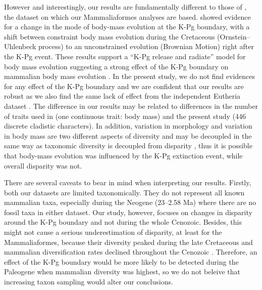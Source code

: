 \documentclass[12pt,letterpaper]{article}
\begin{document}
However and interestingly, our results are fundamentally different to those of \cite{Slater2012MEE}, the dataset on which our Mammaliaformes analyses are based. 
\cite{Slater2012MEE} showed evidence for a change in the mode of body-mass evolution at the K-Pg boundary, with a shift between constraint body mass evolution during the Cretaceous (Ornstein–Uhlenbeck process) to an unconstrained evolution (Brownian Motion) right after the K-Pg event.
These results support a ``K-Pg release and radiate'' model for body mass evolution suggesting a strong effect of the K-Pg boundary on mammalian body mass evolution \citep{Slater2012MEE}. %
In the present study, we do not find evidences for any effect of the K-Pg boundary and we are confident that our results are robust as we also find the same lack of effect from the independent Eutheria dataset \citep[i.e.][]{beckancient2014}.
The difference in our results may be related to differences in the number of traits used in \cite{Slater2012MEE} (one continuous trait: body mass) and the present study (446 discrete cladistic characters).
In addition, variation in morphology and variation in body mass are two different aspects of diversity and may be decoupled in the same way as taxonomic diversity is decoupled from disparity \citep{slaterCetacean,ruta2013,hopkinsdecoupling2013}, thus it is possible that body-mass evolution was influenced by the K-Pg extinction event, while overall disparity was not.

There are several caveats to bear in mind when interpreting our results. 
Firstly, both our datasets are limited taxonomically.
They do not represent all known mammalian taxa, especially during the Neogene (23--2.58 Ma) where there are no fossil taxa in either dataset.
Our study, however, focuses on changes in disparity around the K-Pg boundary and not during the whole Cenozoic.
Besides, this might not cause a serious underestimation of disparity, at least for the Mammaliaformes, because their diversity peaked during the late Cretaceous \citep[Campanian; 72.1--83.6 Ma;][]{Newham201432} and mammalian diversification rates declined throughout the Cenozoic \citep{Raia2012}.
Therefore, an effect of the K-Pg boundary would be more likely to be detected during the Paleogene when mammalian diversity was highest, so we do not beleive that increasing taxon sampling would alter our conclusions.
\end{document}
